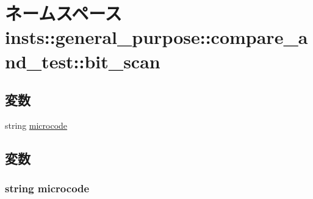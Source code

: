 \hypertarget{namespaceinsts_1_1general__purpose_1_1compare__and__test_1_1bit__scan}{
\section{ネームスペース insts::general\_\-purpose::compare\_\-and\_\-test::bit\_\-scan}
\label{namespaceinsts_1_1general__purpose_1_1compare__and__test_1_1bit__scan}
}
\subsection*{変数}
\begin{DoxyCompactItemize}
\item 
string \hyperlink{namespaceinsts_1_1general__purpose_1_1compare__and__test_1_1bit__scan_a770f11a173e99389a8802f0107ed8f52}{microcode}
\end{DoxyCompactItemize}


\subsection{変数}
\hypertarget{namespaceinsts_1_1general__purpose_1_1compare__and__test_1_1bit__scan_a770f11a173e99389a8802f0107ed8f52}{
\subsubsection[{microcode}]{\setlength{\rightskip}{0pt plus 5cm}string {\bf microcode}}}
\label{namespaceinsts_1_1general__purpose_1_1compare__and__test_1_1bit__scan_a770f11a173e99389a8802f0107ed8f52}
